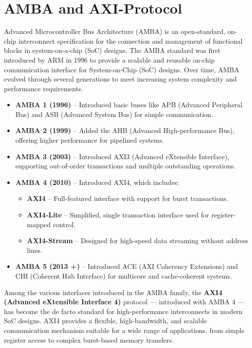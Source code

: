 \section{AMBA and AXI-Protocol}

Advanced Microcontroller Bus Architecture (AMBA) is an open-standard, on-chip interconnect specification for the connection and management of functional blocks in system-on-a-chip (SoC) designs. The AMBA standard was first introduced by ARM in 1996 to provide a scalable and reusable on-chip communication interface for System-on-Chip (SoC) designs. Over time, AMBA evolved through several generations to meet increasing system complexity and performance requirements.

\begin{itemize}
    \item \textbf{AMBA 1 (1996)} – Introduced basic buses like APB (Advanced Peripheral Bus) and ASB (Advanced System Bus) for simple communication.
    \item \textbf{AMBA 2 (1999)} – Added the AHB (Advanced High-performance Bus), offering higher performance for pipelined systems.
    \item \textbf{AMBA 3 (2003)} – Introduced AXI3 (Advanced eXtensible Interface), supporting out-of-order transactions and multiple outstanding operations.
    \item \textbf{AMBA 4 (2010)} – Introduced AXI4, which includes:
        \begin{itemize}
            \item \textbf{AXI4} – Full-featured interface with support for burst transactions.
            \item \textbf{AXI4-Lite} – Simplified, single transaction interface used for register-mapped control.
            \item \textbf{AXI4-Stream} – Designed for high-speed data streaming without address lines.
        \end{itemize}
    \item \textbf{AMBA 5 (2013 +)} – Introduced ACE (AXI Coherency Extensions) and CHI (Coherent Hub Interface) for multicore and cache-coherent systems.
\end{itemize}

Among the various interfaces introduced in the AMBA family, the \textbf{AXI4 (Advanced eXtensible Interface 4)} protocol — introduced with AMBA 4 — has become the de facto standard for high-performance interconnects in modern SoC designs. AXI4 provides a flexible, high-bandwidth, and scalable communication mechanism suitable for a wide range of applications, from simple register access to complex burst-based memory transfers.


